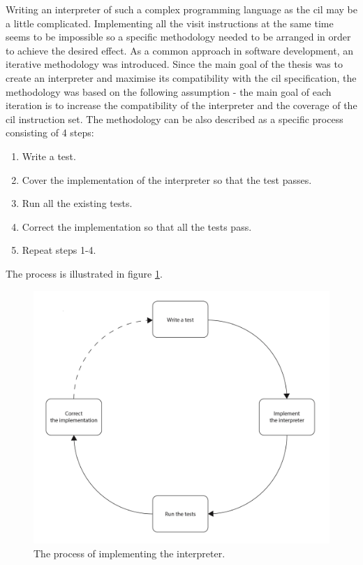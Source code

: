 \documentclass[declaration,shortabstract,english,mgr]{iithesis}
\begin{document}
Writing an interpreter of such a complex programming language as the \acrshort{cil} may be a little complicated. Implementing all the visit instructions at the same time seems to be impossible so a specific methodology needed to be arranged in order to achieve the desired effect. As a common approach in software development, an iterative methodology was introduced. Since the main goal of the thesis was to create an interpreter and maximise its compatibility with the \acrshort{cil} specification, the methodology was based on the following assumption - the main goal of each iteration is to increase the compatibility of the interpreter and the coverage of the \acrshort{cil} instruction set. The methodology can be also described as a specific process consisting of 4 steps:
\begin{enumerate}
	\item{Write a test.}
	\item{Cover the implementation of the interpreter so that the test passes.}
	\item{Run all the existing tests.}
	\item{Correct the implementation so that all the tests pass.}
	\item{Repeat steps 1-4.}
\end{enumerate}
The process is illustrated in figure \ref{fig:process}.

\begin{figure}
	\includegraphics[width=1\textwidth]{process.jpg}
    \centering
    \caption{The process of implementing the interpreter.}
    \label{fig:process}
\end{figure}
\end{document}

